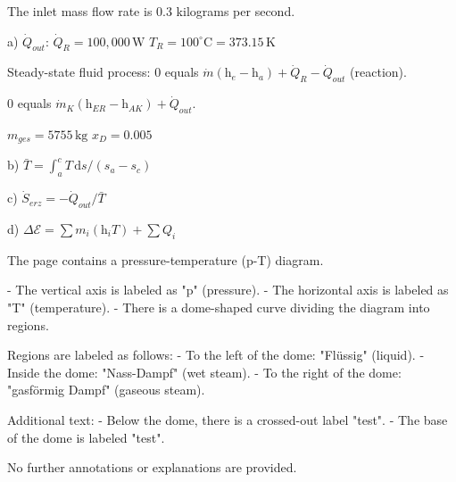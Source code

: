 The inlet mass flow rate is 0.3 kilograms per second.  

a) \( \dot{Q}_{out} \):  
\( \dot{Q}_R = 100,000 \, \text{W} \)  
\( T_R = 100^\circ \text{C} = 373.15 \, \text{K} \)  

Steady-state fluid process:  
0 equals \( \dot{m} (\text{h}_{e} - \text{h}_{a}) + \dot{Q}_R - \dot{Q}_{out} \) (reaction).  

0 equals \( \dot{m}_K (\text{h}_{ER} - \text{h}_{AK}) + \dot{Q}_{out} \).  

\( m_{ges} = 5755 \, \text{kg} \)  
\( x_D = 0.005 \)  

b)  
\( \bar{T} = \int_{a}^{c} T \, \text{d}s / (s_a - s_c) \)  

c)  
\( \dot{S}_{erz} = - \dot{Q}_{out} / \bar{T} \)  

d)  
\( \Delta \mathcal{E} = \sum m_i (\text{h}_i T) + \sum Q_i \)

The page contains a pressure-temperature (p-T) diagram.  

- The vertical axis is labeled as "p" (pressure).  
- The horizontal axis is labeled as "T" (temperature).  
- There is a dome-shaped curve dividing the diagram into regions.  

Regions are labeled as follows:  
- To the left of the dome: "Flüssig" (liquid).  
- Inside the dome: "Nass-Dampf" (wet steam).  
- To the right of the dome: "gasförmig Dampf" (gaseous steam).  

Additional text:  
- Below the dome, there is a crossed-out label "test".  
- The base of the dome is labeled "test".  

No further annotations or explanations are provided.